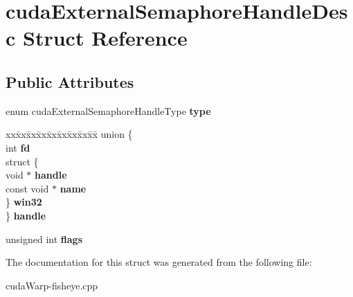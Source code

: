 \hypertarget{structcudaExternalSemaphoreHandleDesc}{}\section{cuda\+External\+Semaphore\+Handle\+Desc Struct Reference}
\label{structcudaExternalSemaphoreHandleDesc}
\subsection*{Public Attributes}
\begin{DoxyCompactItemize}
\item 
enum cuda\+External\+Semaphore\+Handle\+Type {\bfseries type}\hypertarget{structcudaExternalSemaphoreHandleDesc_ae925b19e386170fb3cccf58cfab0fd9c}{}\label{structcudaExternalSemaphoreHandleDesc_ae925b19e386170fb3cccf58cfab0fd9c}

\item 
\begin{tabbing}
xx\=xx\=xx\=xx\=xx\=xx\=xx\=xx\=xx\=\kill
union \{\\
\>int {\bfseries fd}\\
\>struct \{\\
\>\>void $\ast$ {\bfseries handle}\\
\>\>const void $\ast$ {\bfseries name}\\
\>\} {\bfseries win32}\\
\} {\bfseries handle}\hypertarget{structcudaExternalSemaphoreHandleDesc_a764e242603a043157c8a18961d62fd96}{}\label{structcudaExternalSemaphoreHandleDesc_a764e242603a043157c8a18961d62fd96}
\\

\end{tabbing}\item 
unsigned int {\bfseries flags}\hypertarget{structcudaExternalSemaphoreHandleDesc_addc4ddcce38ec7f5582e38fe278783b5}{}\label{structcudaExternalSemaphoreHandleDesc_addc4ddcce38ec7f5582e38fe278783b5}

\end{DoxyCompactItemize}


The documentation for this struct was generated from the following file\+:\begin{DoxyCompactItemize}
\item 
cuda\+Warp-\/fisheye.\+cpp\end{DoxyCompactItemize}
